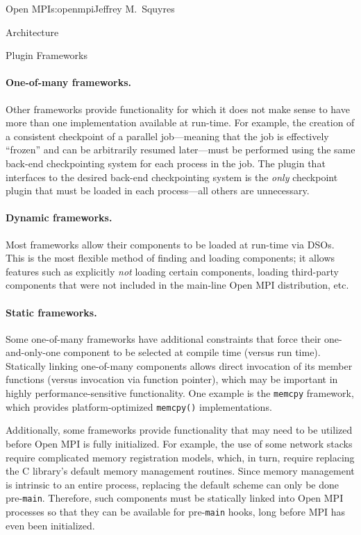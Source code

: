 \begin{aosachapter}{Open MPI}{s:openmpi}{Jeffrey M.\ Squyres}
\begin{aosasect1}{Architecture}
\begin{aosasect2}{Plugin Frameworks}

\paragraph{One-of-many frameworks.} 

Other frameworks provide functionality for which it does not make sense to
have more than one implementation available at run-time.
%
For example, the creation of a consistent checkpoint of a parallel 
job---meaning that the job is effectively ``frozen'' and can be arbitrarily
resumed later---must be performed using the same back-end
checkpointing system for each process in the job.
%
The plugin that interfaces to the desired back-end checkpointing
system is the \emph{only} checkpoint plugin that must be loaded in each
process---all others are unnecessary.


\paragraph{Dynamic frameworks.} 

Most frameworks allow their components to be loaded at run-time via
DSOs.  This is the most flexible method of finding and loading
components; it allows features such as explicitly \emph{not} loading
certain components, loading third-party components that were not
included in the main-line Open MPI distribution, etc.


\paragraph{Static frameworks.} 

Some one-of-many frameworks have additional constraints that force
their one-and-only-one component to be selected at compile time (versus
run time).  Statically linking one-of-many components allows direct
invocation of its member functions (versus invocation via function
pointer), which may be important in highly performance-sensitive
functionality.  One example is the {\tt memcpy} framework, which
provides platform-optimized {\tt memcpy()} implementations.

Additionally, some frameworks provide functionality that may need to
be utilized before Open MPI is fully initialized.  
%
For example, the use of some network stacks require complicated memory
registration models, which, in turn, require replacing the C library's
default memory management routines.
%
Since memory management is intrinsic to an entire process, replacing
the default scheme can only be done pre-{\tt main}.
%
Therefore, such components must be statically linked into Open MPI
processes so that they can be available for pre-{\tt main} hooks, long
before MPI has even been initialized.


\end{aosasect2}
\end{aosasect1}
\end{aosachapter}
